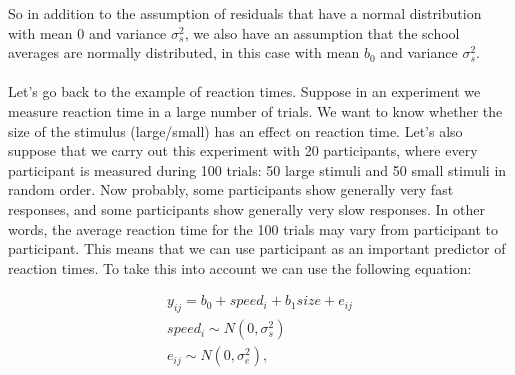 \documentclass[]{report}\usepackage[]{graphicx}\usepackage[]{color}
\begin{document}
So in addition to the assumption of residuals that have a normal distribution with mean 0 and variance $\sigma_s^2$, we also have an assumption that the school averages are normally distributed, in this case with mean $b_0$ and variance $\sigma_s^2$.
\\
\\
Let's go back to the example of reaction times. Suppose in an experiment we measure reaction time in a large number of trials. We want to know whether the size of the stimulus (large/small) has an effect on reaction time. Let's also suppose that we carry out this experiment with 20 participants, where every participant is measured during 100 trials: 50 large stimuli and 50 small stimuli in random order. Now probably, some participants show generally very fast responses, and some participants show generally very slow responses. In other words, the average reaction time for the 100 trials may vary from participant to participant. This means that we can use participant as an important predictor of reaction times. To take this into account we can use the following equation:


\begin{eqnarray}
y_{ij} = b_0 + speed_i + b_1 size + e_{ij} \\
speed_i \sim N(0, \sigma_s^2)\\
e_{ij} \sim N(0, \sigma_e^2),
\end{eqnarray}
\end{document}
